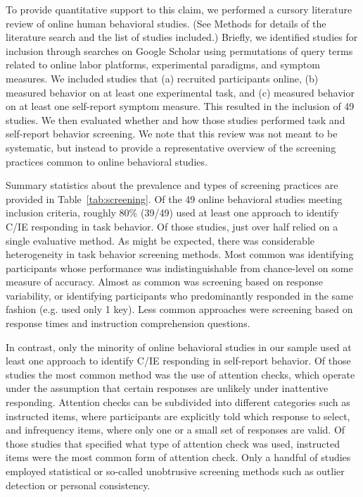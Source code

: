 \documentclass[a4paper,notitlepage,12pt]{article}
\begin{document}
To provide quantitative support to this claim, we performed a cursory literature review of online human behavioral studies. (See Methods for details of the literature search and the list of studies included.) Briefly, we identified studies for inclusion through searches on Google Scholar using permutations of query terms related to online labor platforms, experimental paradigms, and symptom measures. We included studies that (a) recruited participants online, (b) measured behavior on at least one experimental task, and (c) measured behavior on at least one self-report symptom measure. This resulted in the inclusion of 49 studies. We then evaluated whether and how those studies performed task and self-report behavior screening. We note that this review was not meant to be systematic, but instead to provide a representative overview of the screening practices common to online behavioral studies.

Summary statistics about the prevalence and types of screening practices are provided in Table~\ref{tab:screening}. Of the 49 online behavioral studies meeting inclusion criteria, roughly 80\% (39/49) used at least one approach to identify C/IE responding in task behavior. Of those studies, just over half relied on a single evaluative method. As might be expected, there was considerable heterogeneity in task behavior screening methods. Most common was identifying participants whose performance was indistinguishable from chance-level on some measure of accuracy. Almost as common was screening based on response variability, or identifying participants who predominantly responded in the same fashion (e.g. used only 1 key). Less common approaches were screening based on response times and instruction comprehension questions. 

In contrast, only the minority of online behavioral studies in our sample used at least one approach to identify C/IE responding in self-report behavior. Of those studies the most common method was the use of attention checks, which operate under the assumption that certain responses are unlikely under inattentive responding. Attention checks can be subdivided into different categories such as instructed items, where participants are explicitly told which response to select, and infrequency items, where only one or a small set of responses are valid. Of those studies that specified what type of attention check was used, instructed items were the most common form of attention check. Only a handful of studies employed statistical or so-called unobtrusive screening methods such as outlier detection or personal consistency. 
\end{document}
